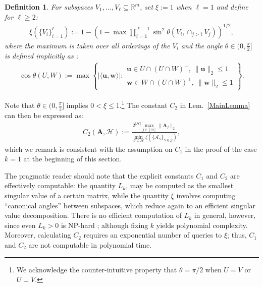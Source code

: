 \documentclass[9pt,twocolumn]{pnas-new}
\newtheorem{definition}{Definition}
\begin{document}
\begin{definition}\label{SpecialSupportSet}\label{FriedrichsDefinition}
For subspaces $V_1, \ldots, V_\ell \subseteq \mathbb{R}^m$, set $\xi := 1$ when $\ell = 1$ and define for $\ell \geq 2$:
\begin{align*}
\xi(\{V_i\}_{i=1}^\ell) := 1 - \left(1 -  \max \prod_{i=1}^{\ell-1} \sin^2  \theta \left(V_i, \cap_{j>i} V_j \right)  \right)^{1/2},
\end{align*} 
%
where the maximum is taken over all orderings 
of the $V_i$ and the angle $\theta \in (0,\frac{\pi}{2}]$ is defined implicitly as \cite[Def.~9.4]{Deutsch12}:
\begin{align*}
\cos{\theta(U,W)} := \max\left\{ |\langle \mathbf{u}, \mathbf{w} \rangle|: \substack{ \mathbf{u} \in U \cap (U \cap W)^\perp, \ \|\mathbf{u}\|_2 \leq 1 \\ \mathbf{w} \in W \cap (U \cap W)^\perp, \  \|\mathbf{w}\|_2 \leq 1 } \right\}.
\end{align*}
\end{definition}
Note that $\theta \in (0,\frac{\pi}{2}]$ implies $0 < \xi \leq 1$.\footnote{We acknowledge the counter-intuitive property that $\theta =  \pi/2$ when $U = V$ or $U \perp V$.}  
The constant $C_2$ in Lem.~\ref{MainLemma} can then be expressed as:  
\begin{align}\label{Cdef2}
C_2(\mathbf{A}, \mathcal{H}) := \frac{ 2^{|\mathcal{H}|} \max_{j \in [m]} \|\mathbf{A}_j\|_2}{ \min_{\mathcal{G} \subseteq \mathcal{H}} \xi( \{ \bm{\mathcal{A}}_S \}_{S \in \mathcal{G}}) },
\end{align}
%
which we remark is consistent with the assumption on $C_1$ in the proof of the case $k=1$ at the beginning of this section.  

The pragmatic reader should note that the explicit constants $C_1$ and $C_2$ are effectively computable: the quantity $L_k$, may be computed as the smallest singular value of a certain matrix, while the quantity $\xi$ involves computing ``canonical angles'' between subspaces, which reduce again to an efficient singular value decomposition. There is no efficient computation of $L_k$ in general, however, since even $L_{k} > 0$ is NP-hard \cite{tillmann2014computational}; although fixing $k$ yields polynomial complexity. Moreover, calculating $C_2$ requires an exponential number of queries to $\xi$; thus, $C_1$ and $C_2$ are not computable in polynomial time.
\end{document}
